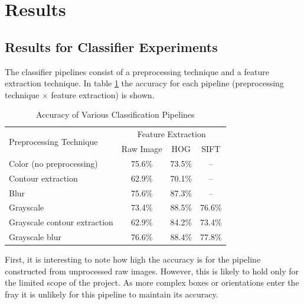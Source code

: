 \documentclass[letterpaper, 10 pt, conference]{conf/ieeeconf}  %
\begin{document}
\section{Results}
\label{sec:results}

\subsection{Results for Classifier Experiments}
The classifier pipelines consist of a preprocessing technique and a feature
extraction technique. In table \ref{tab:classification} the accuracy for each
pipeline (preprocessing technique $\times$ feature extraction) is shown.
\begin{table}[h]
  \centering
  \begin{tabular}{l c c c}
    \toprule
    \multirow{2}{*}[-0.5\dimexpr \aboverulesep + \belowrulesep + \cmidrulewidth]{Preprocessing Technique} & \multicolumn{3}{c}{Feature Extraction}\\
    \cmidrule(lr){2-4}
                            & Raw Image & HOG & SIFT \\
    \midrule
    Color (no preprocessing)     & 75.6\% & 73.5\%                    & -- \\
    Contour extraction           & 62.9\% & 70.1\%                    & -- \\
    Blur                         & 75.6\% & 87.3\%                    & -- \\
    Grayscale                    & 73.4\% & \cellcolor{blue!25}88.5\% & 76.6\% \\
    Grayscale contour extraction & 62.9\% & 84.2\%                    & 73.4\% \\
    Grayscale blur               & 76.6\% & 88.4\%                    & 77.8\% \\
    \bottomrule
  \end{tabular}
  \caption{Accuracy of Various Classification Pipelines}
  \label{tab:classification}
\end{table}

First, it is interesting to note how high the accuracy is for the pipeline
constructed from unprocessed raw images. However, this is likely to hold only
for the limited scope of the project. As more complex boxes or orientations
enter the fray it is unlikely for this pipeline to maintain its accuracy.\\
\end{document}
